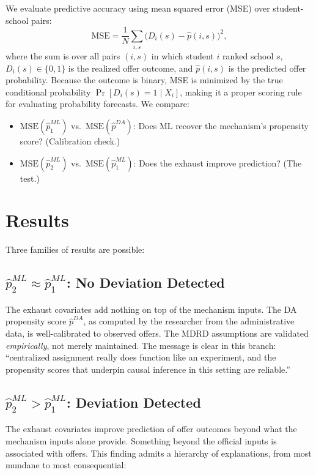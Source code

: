\documentclass[12pt,a4paper,dvipsnames]{article}
\begin{document}
We evaluate predictive accuracy using mean squared error (MSE) over student-school pairs:
\[
\text{MSE} = \frac{1}{N} \sum_{i,s} \big( D_i(s) - \hat{p}(i,s) \big)^2,
\]
where the sum is over all pairs $(i,s)$ in which student $i$ ranked school $s$, $D_i(s) \in \{0,1\}$ is the realized offer outcome, and $\hat{p}(i,s)$ is the predicted offer probability. Because the outcome is binary, MSE is minimized by the true conditional probability $\Pr[D_i(s) = 1 \mid X_i]$, making it a proper scoring rule for evaluating probability forecasts. We compare:
\begin{itemize}
    \item $\text{MSE}(\hat{p}^{ML}_1)$ vs.\ $\text{MSE}(\hat{p}^{DA})$: Does ML recover the mechanism's propensity score? (Calibration check.)
    \item $\text{MSE}(\hat{p}^{ML}_2)$ vs.\ $\text{MSE}(\hat{p}^{ML}_1)$: Does the exhaust improve prediction? (The test.)
\end{itemize}

\section{Results}

\noindent Three families of results are possible:

\subsection{$\hat{p}^{ML}_2 \approx \hat{p}^{ML}_1$: No Deviation Detected}

The exhaust covariates add nothing on top of the mechanism inputs. The DA propensity score $\hat{p}^{DA}$, as computed by the researcher from the administrative data, is well-calibrated to observed offers. The MDRD assumptions are validated \textit{empirically}, not merely maintained. The message is clear in this branch: ``centralized assignment really does function like an experiment, and the propensity scores that underpin causal inference in this setting are reliable.''

\subsection{$\hat{p}^{ML}_2 > \hat{p}^{ML}_1$: Deviation Detected}

The exhaust covariates improve prediction of offer outcomes beyond what the mechanism inputs alone provide. Something beyond the official inputs is associated with offers. This finding admits a hierarchy of explanations, from most mundane to most consequential:
\end{document}
